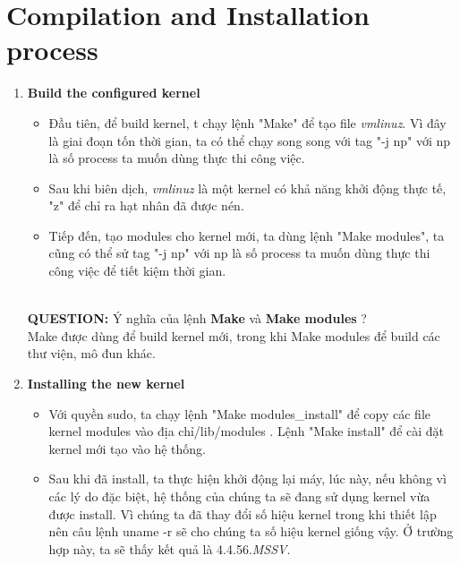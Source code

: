 \documentclass[a4paper]{article}
\begin{document}
\section{Compilation and Installation process}
\begin{enumerate}
\item \textbf{Build the configured kernel}
\\
\begin{itemize}
\item Đầu tiên, để build kernel, t chạy lệnh "Make" để tạo file \textit{vmlinuz}. Vì đây là giai đoạn tốn thời gian, ta có thể chạy song song với tag "-j   np" với np là số process ta muốn dùng thực thi công việc.
\item Sau khi biên dịch, \textit{vmlinuz} là một kernel có khả năng khởi động thực tế, "z" để chỉ ra hạt nhân đã được nén.
\item Tiếp đến, tạo modules cho kernel mới, ta dùng lệnh "Make modules", ta cũng có thể sử tag "-j   np" với np là số process ta muốn dùng thực thi công việc để tiết kiệm thời gian.
\end{itemize}
\\
\textbf{QUESTION:} Ý nghĩa của lệnh\textbf{ Make} và \textbf{Make modules }?\\
Make được dùng để build kernel mới, trong khi Make modules để build các
thư viện, mô đun khác.
\item \textbf{Installing the new kernel}
\begin{itemize}
\item Với quyền sudo, ta chạy lệnh "Make modules\_install" để  copy các file kernel modules vào địa chỉ/lib/modules . Lệnh "Make install" để cài đặt kernel mới tạo vào hệ thống.
\item Sau khi đã install, ta thực hiện khởi động lại máy, lúc này, nếu không vì các lý do đặc
biệt, hệ thống của chúng ta sẽ đang sử dụng kernel vừa được install. Vì chúng ta đã
thay đổi số hiệu kernel trong khi thiết lập nên câu lệnh uname -r sẽ cho chúng ta số
hiệu kernel giống vậy. Ở trường hợp này, ta sẽ thấy kết quả là 4.4.56.\textit{MSSV}.
\end{itemize}


\end{enumerate}
\end{document}
